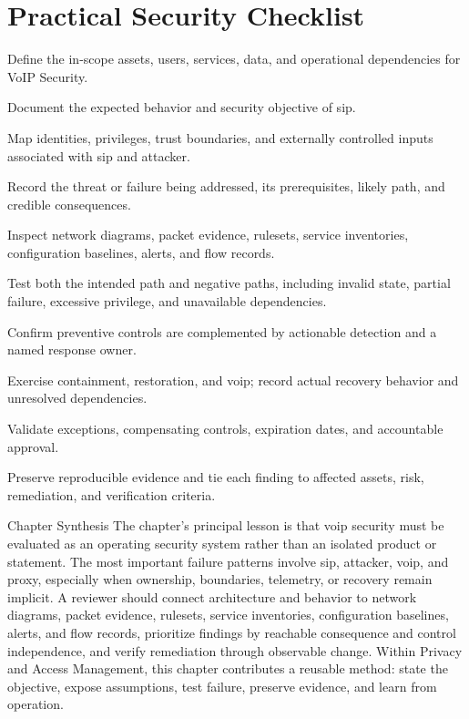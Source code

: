 \documentclass[11pt,letterpaper]{article}
\begin{document}
\section*{Practical Security Checklist}
\begin{CornellChecklist}
\item Define the in-scope assets, users, services, data, and operational dependencies for VoIP Security.
\item Document the expected behavior and security objective of sip.
\item Map identities, privileges, trust boundaries, and externally controlled inputs associated with sip and attacker.
\item Record the threat or failure being addressed, its prerequisites, likely path, and credible consequences.
\item Inspect network diagrams, packet evidence, rulesets, service inventories, configuration baselines, alerts, and flow records.
\item Test both the intended path and negative paths, including invalid state, partial failure, excessive privilege, and unavailable dependencies.
\item Confirm preventive controls are complemented by actionable detection and a named response owner.
\item Exercise containment, restoration, and voip; record actual recovery behavior and unresolved dependencies.
\item Validate exceptions, compensating controls, expiration dates, and accountable approval.
\item Preserve reproducible evidence and tie each finding to affected assets, risk, remediation, and verification criteria.
\end{CornellChecklist}
\begin{CornellSummaryBox}{Chapter Synthesis}
The chapter's principal lesson is that voip security must be evaluated as an operating security system rather than an isolated product or statement. The most important failure patterns involve sip, attacker, voip, and proxy, especially when ownership, boundaries, telemetry, or recovery remain implicit. A reviewer should connect architecture and behavior to network diagrams, packet evidence, rulesets, service inventories, configuration baselines, alerts, and flow records, prioritize findings by reachable consequence and control independence, and verify remediation through observable change. Within Privacy and Access Management, this chapter contributes a reusable method: state the objective, expose assumptions, test failure, preserve evidence, and learn from operation.
\end{CornellSummaryBox}
\end{document}
